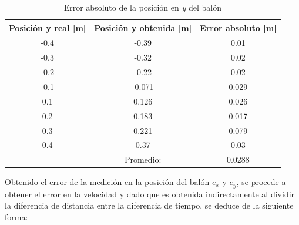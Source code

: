 \begin{table}[]
\begin{tabular}{|c|c|c|}
\hline
\multicolumn{1}{|l|}{\textbf{Posición y real {[}m{]}}} & \multicolumn{1}{l|}{\textbf{Posición y obtenida {[}m{]}}} & \multicolumn{1}{l|}{\textbf{Error absoluto [m]}} \\ \hline
-0.4                                                   & -0.39                                                     & 0.01                                         \\ \hline
-0.3                                                   & -0.32                                                     & 0.02                                         \\ \hline
-0.2                                                   & -0.22                                                     & 0.02                                         \\ \hline
-0.1                                                   & -0.071                                                    & 0.029                                        \\ \hline
0.1                                                    & 0.126                                                     & 0.026                                        \\ \hline
0.2                                                    & 0.183                                                     & 0.017                                        \\ \hline
0.3                                                    & 0.221                                                     & 0.079                                        \\ \hline
0.4                                                    & 0.37                                                      & 0.03                                         \\ \hline
                                                       & Promedio:                                                 & 0.0288                                       \\ \hline
\end{tabular}
\caption{Error absoluto de la posición en \textit{y} del balón}
\label{cuadro:y_position}
\end{table}

	 Obtenido el error de la medición en la posición del balón $e_x$ y $e_y$, se procede a obtener el error en la velocidad y dado que es obtenida indirectamente al dividir la diferencia de distancia entre la diferencia de tiempo, se deduce de la siguiente forma:	 

